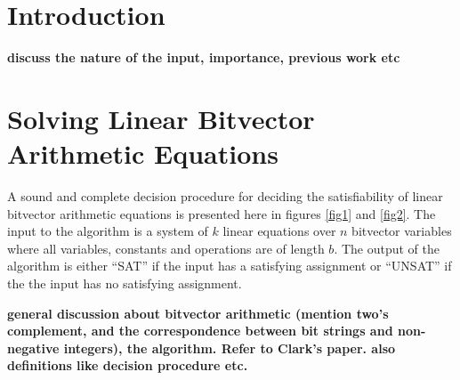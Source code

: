 \newtheorem{theorem}{Theorem}[section]
\newtheorem{lemma}[theorem]{Lemma}
\newtheorem{proposition}[theorem]{Proposition}
\newtheorem{corollary}[theorem]{Corollary}

\newenvironment{proof}[1][Proof]{\begin{trivlist}
\item[\hskip \labelsep {\bfseries #1}]}{\end{trivlist}}
\newenvironment{definition}[1][Definition]{\begin{trivlist}
\item[\hskip \labelsep {\bfseries #1}]}{\end{trivlist}}
\newenvironment{example}[1][Example]{\begin{trivlist}
\item[\hskip \labelsep {\bfseries #1}]}{\end{trivlist}}
\newenvironment{remark}[1][Remark]{\begin{trivlist}
\item[\hskip \labelsep {\bfseries #1}]}{\end{trivlist}}

\newcommand{\qed}{\nobreak \ifvmode \relax \else
  \ifdim\lastskip<1.5em \hskip-\lastskip
  \hskip1.5em plus0em minus0.5em \fi \nobreak
  \vrule height0.75em width0.5em depth0.25em\fi}


%

\section{Introduction}

\textbf{discuss the nature of the input, importance, previous work etc}

\section{Solving Linear Bitvector Arithmetic Equations}
A sound and complete decision procedure for deciding the
satisfiability of linear bitvector arithmetic equations is presented
here in figures \ref{fig1} and \ref{fig2}. The input to the algorithm
is a system of $k$ linear equations over $n$ bitvector variables where
all variables, constants and operations are of length $b$. The output
of the algorithm is either ``SAT'' if the input has a satisfying
assignment or ``UNSAT'' if the the input has no satisfying assignment.

\textbf{general discussion about bitvector arithmetic (mention two's
 complement, and the correspondence between bit strings and
 non-negative integers), the algorithm. Refer to Clark's paper. also
 definitions like decision procedure etc.}

